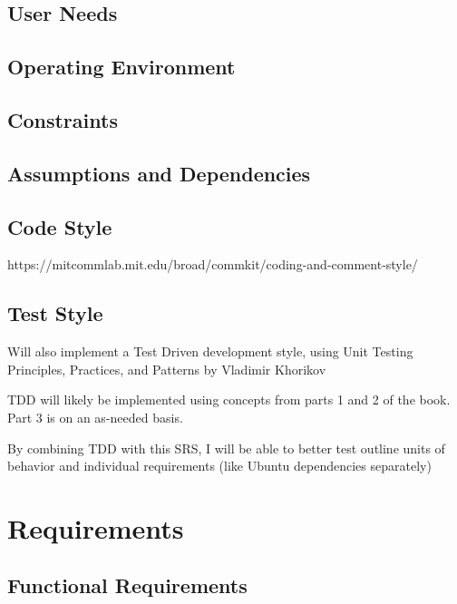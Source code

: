 \section{User Needs}

\section{Operating Environment}

\section{Constraints}

\section{Assumptions and Dependencies}

\section{Code Style}
https://mitcommlab.mit.edu/broad/commkit/coding-and-comment-style/


\section{Test Style}

Will also implement a Test Driven development style, using Unit Testing Principles, Practices, and Patterns by Vladimir Khorikov

TDD will likely be implemented using concepts from parts 1 and 2 of the book. Part 3 is on an as-needed basis.

By combining TDD with this SRS, I will be able to better test outline units of behavior and individual requirements (like Ubuntu dependencies separately)



\newpage




\chapter{Requirements}
\label{Requirements}

\section{Functional Requirements}
